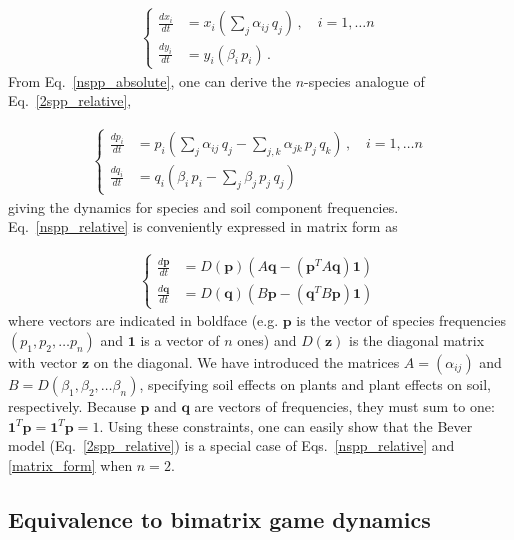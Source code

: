 \documentclass[11pt]{article}
\begin{document}
\begin{align} \label{nspp_absolute}
\begin{cases}
\frac{dx_i}{dt} &= x_i \left(\sum_{j} \alpha_{ij} \, q_j \right) \, , \quad  i = 1, \dots n \\
\frac{dy_i}{dt} &= y_i \left( \beta_i \, p_i \right) \, .
\end{cases}
\end{align}
From Eq.~\ref{nspp_absolute}, one can derive the $n$-species analogue of Eq.~\ref{2spp_relative},

\begin{align} \label{nspp_relative}
\begin{cases}
\frac{dp_i}{dt} &= p_i \left(\sum_{j} \alpha_{ij} \, q_j - \sum_{j, k} \alpha_{jk} \, p_j \, q_k \right) \, , \quad  i = 1, \dots n \\
\frac{dq_i}{dt} &= q_i \left(\beta_{i} \, p_i - \sum_{j} \beta_{j} \, p_j \, q_j  \right) \,
\end{cases}
\end{align}
giving the dynamics for species and soil component frequencies. Eq.~\ref{nspp_relative} is conveniently expressed in matrix form as

\begin{align} \label{matrix_form}
\begin{cases}
\frac{d\bm{p}}{dt} &= D(\bm{p}) \left(A \bm{q} - (\bm{p}^T A \bm{q}) \bm{1} \right) \\
\frac{d\bm{q}}{dt} &= D(\bm{q}) \left(B \bm{p} - (\bm{q}^T B \bm{p}) \bm{1}  \right) \,
\end{cases}
\end{align}
where vectors are indicated in boldface (e.g. $\bm{p}$ is the vector of species frequencies $(p_1, p_2, \dots p_n)$ and $\bm{1}$ is a vector of $n$ ones) and $D(\bm{z})$ is the diagonal matrix with vector $\bm{z}$ on the diagonal. We have introduced the matrices $A = (\alpha_{ij})$ and $B = D(\beta_1, \beta_2, \dots \beta_n)$, specifying soil effects on plants and plant effects on soil, respectively. Because $\bm{p}$ and $\bm{q}$ are vectors of frequencies, they must sum to one: $\bm{1}^T \bm{p} = \bm{1}^T \bm{p} = 1$. Using these constraints, one can easily show that the Bever model (Eq.~\ref{2spp_relative}) is a special case of Eqs.~\ref{nspp_relative} and \ref{matrix_form} when $n = 2$.

\subsection{Equivalence to bimatrix game dynamics}
\end{document}
